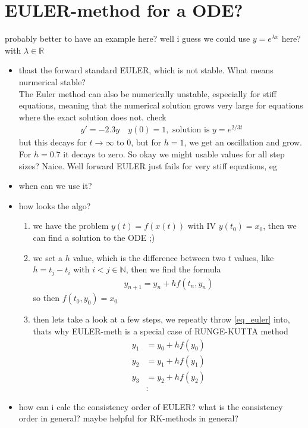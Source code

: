 \documentclass[]{scrartcl}
\newcommand{\N}{\mathbb{N}}
\newcommand{\R}{\mathbb{R}}
\newcommand{\<}{\trianglelefteq}
\begin{document}
\section*{EULER-method for a ODE?}
probably better to have an example here? well i guess we could use $y = e^{\lambda x}$ here? with $\lambda \in \R$
\begin{itemize}
	\item thast the forward standard EULER, which is not stable. What means nurmerical stable?\\
	The Euler method can also be numerically unstable, especially for stiff equations, meaning that the numerical solution grows very large for equations where the exact solution does not. check
	\begin{align*}
		y' = -2.3y \quad y(0) = 1, \text{ solution is } y = e^{2/3 t}
	\end{align*}
	but this decays for $t \to \infty$ to 0, but for $h = 1$, we get an oscillation and grow. For $h = 0.7$ it decays to zero. So okay we might usable values for all step sizes? Naice. Well forward EULER just fails for very stiff equations, eg
	\item when can we use it?
	\item how looks the algo?
	\begin{enumerate}
		\item we have the problem $y(t) = f(x(t))$ with IV $y(t_0) = x_0$, then we can find a solution to the ODE ;)
		\item we set a $h$ value, which is the difference between two $t$ values, like $h = t_j - t_i$ with $i< j \in \N$, then we find the formula
		\begin{align*}
			y_{n+1} = y_n + hf(t_n,y_n) \label{eq_euler}\tag{Euler}
		\end{align*}
		so then $f(t_0,y_0) = x_0$
		\item then lets take a look at a few steps, we repeatly throw \eqref{eq_euler} into, thats why EULER-meth is a special case of RUNGE-KUTTA method
		\begin{align*}
			y_1 &= y_0 +hf(y_0)\\
			y_2 & = y_1 + hf(y_1)\\
			y_3 &= y_2 + hf(y_2)\\
			&: 
		\end{align*}
	\end{enumerate}
	\item how can i calc the consistency order of EULER? what is the consistency order in general? maybe helpful for RK-methods in general?
\end{itemize}
\end{document}
